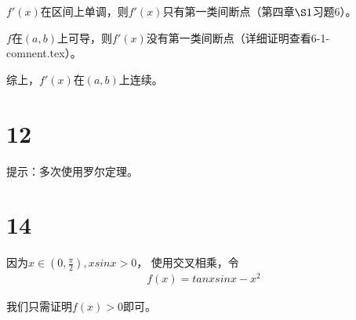 \documentclass{article}
\begin{document}
$f'(x)$在区间上单调，则$f'(x)$只有第一类间断点（第四章$\S 1$习题6）。

$f$在$(a, b)$上可导，则$f'(x)$没有第一类间断点（详细证明查看6-1-comnent.tex）。

综上，$f'(x)$在$(a, b)$上连续。

\section*{12}

提示：多次使用罗尔定理。

\section*{14}

因为$x \in (0, \frac{\pi}{2}), x sinx > 0$，
使用交叉相乘，令
\begin{align*}
  f(x) = tanx sinx - x^2
\end{align*}

我们只需证明$f(x) > 0$即可。
\end{document}
